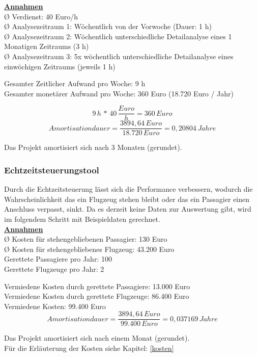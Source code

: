 	{
		\noindent
		\underline{\textbf{Annahmen}}\\
		Ø Verdienst: 40 Euro/h\\
		Ø Analysezeitraum 1: Wöchentlich von der Vorwoche (Dauer: 1 h)\\
		Ø Analysezeitraum 2: Wöchentlich unterschiedliche Detailanalyse eines 1 Monatigen Zeitraums (3 h)\\
		Ø Analysezeitraum 3: 5x wöchentlich unterschiedliche Detailanalyse eines einwöchigen Zeitraums (jeweils 1 h)\\

	}

	{
		\noindent
		Gesamter Zeitlicher Aufwand pro Woche: 9 h\\
		Gesamter monetärer Aufwand pro Woche: 360 Euro (18.720 Euro / Jahr)

		\[ 9\,h\,*\,40\,\frac{Euro}{h} = 360\,Euro \]
		\[ Amortisationdauer = \frac{3894,64\,Euro}{18.720\,Euro} = 0,20804\,Jahre \]

		Das Projekt amortisiert sich nach 3 Monaten (gerundet).

	}

	
	\subsubsection{Echtzeitsteuerungstool}

	{
		Durch die Echtzeitsteuerung lässt sich die Performance verbessern, wodurch die Wahrscheinlichkeit das ein Flugzeug stehen bleibt oder das ein Passagier einen Anschluss verpasst, sinkt. Da es derzeit keine Daten zur Auswertung gibt, wird im folgendem Schritt mit Beispieldaten gerechnet.\\
		\noindent
		\underline{\textbf{Annahmen}}\\
		Ø Kosten für stehengebliebenen Passagier: 130 Euro\\
		Ø Kosten für stehengebliebenes Flugzeug: 43.200 Euro\\
		Gerettete Passagiere pro Jahr: 100\\
		Gerettete Flugzeuge pro Jahr: 2\\

	}

	{
		\noindent
		Vermiedene Kosten durch gerettete Passagiere: 13.000 Euro\\
		Vermiedene Kosten durch gerettete Flugzeuge: 86.400 Euro\\
		Vermiedene Kosten: 99.400 Euro\\

		\[ Amortisationdauer = \frac{3894,64\,Euro}{99.400\,Euro} = 0,037169\,Jahre \]

		Das Projekt amortisiert sich nach einem Monat (gerundet).\\
		\vspace{8pt}
		Für die Erläuterung der Kosten siehe Kapitel: \ref{kosten}
	}